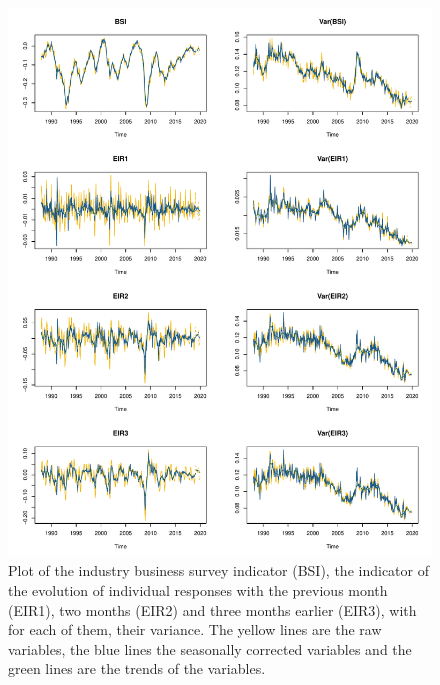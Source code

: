 \documentclass[12pt,a4paper,oneside]{book}
\begin{document}
 
\begin{figure}[htp!]
    \centering
    \includegraphics[scale=0.74]{Graphs/RJDemetra_plots.pdf}
    \caption{Plot of the industry business survey indicator (BSI), the indicator of the evolution of individual responses with the previous month (EIR1), two months (EIR2) and three months earlier (EIR3), with for each of them, their variance. The yellow lines are the raw variables, the blue lines the seasonally corrected variables and the green lines are the trends of the variables.}
    \label{fig:seasonal ajusted rjdemetra}
\end{figure}



\end{document}
